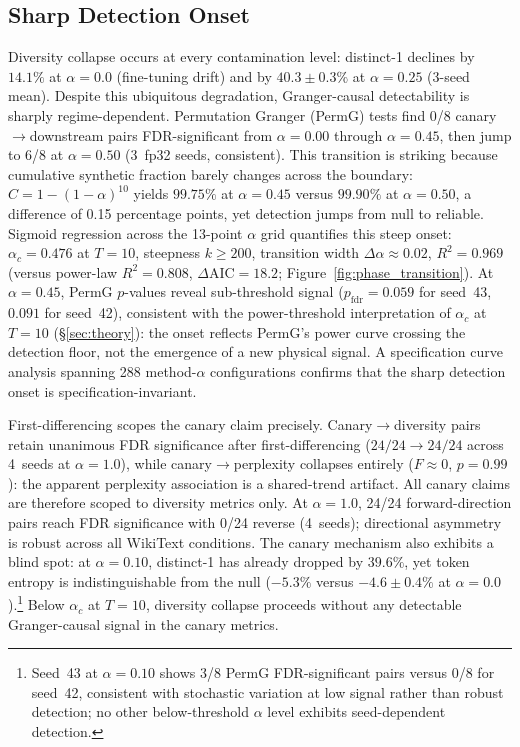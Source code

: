 \subsection{Sharp Detection Onset}
\label{sec:regime}

Diversity collapse occurs at every contamination level: distinct-1 declines by $14.1\%$ at $\alpha{=}0.0$ (fine-tuning drift) and by $40.3{\pm}0.3\%$ at $\alpha{=}0.25$ (3-seed mean).
Despite this ubiquitous degradation, Granger-causal detectability is sharply regime-dependent.
Permutation Granger (PermG) tests find 0/8 canary$\to$downstream pairs FDR-significant from $\alpha{=}0.00$ through $\alpha{=}0.45$, then jump to 6/8 at $\alpha{=}0.50$ (3~fp32 seeds, consistent).
This transition is striking because cumulative synthetic fraction barely changes across the boundary: $C = 1{-}(1{-}\alpha)^{10}$ yields $99.75\%$ at $\alpha{=}0.45$ versus $99.90\%$ at $\alpha{=}0.50$, a difference of 0.15 percentage points, yet detection jumps from null to reliable.
Sigmoid regression across the 13-point $\alpha$ grid quantifies this steep onset: $\alpha_c = 0.476$ at $T{=}10$, steepness $k \geq 200$, transition width $\Delta\alpha \approx 0.02$, $R^2 = 0.969$ (versus power-law $R^2 = 0.808$, $\Delta\mathrm{AIC} = 18.2$; Figure~\ref{fig:phase_transition}).
At $\alpha{=}0.45$, PermG $p$-values reveal sub-threshold signal ($p_{\mathrm{fdr}} = 0.059$ for seed~43, $0.091$ for seed~42), consistent with the power-threshold interpretation of $\alpha_c$ at $T{=}10$ (\S\ref{sec:theory}): the onset reflects PermG's power curve crossing the detection floor, not the emergence of a new physical signal.
A specification curve analysis spanning 288 method-$\alpha$ configurations confirms that the sharp detection onset is specification-invariant.

First-differencing scopes the canary claim precisely.
Canary$\to$diversity pairs retain unanimous FDR significance after first-differencing ($24/24 \to 24/24$ across 4~seeds at $\alpha{=}1.0$), while canary$\to$perplexity collapses entirely ($F \approx 0$, $p = 0.99$): the apparent perplexity association is a shared-trend artifact.
All canary claims are therefore scoped to diversity metrics only.
At $\alpha{=}1.0$, 24/24 forward-direction pairs reach FDR significance with 0/24 reverse (4~seeds); directional asymmetry is robust across all WikiText conditions.
The canary mechanism also exhibits a blind spot: at $\alpha{=}0.10$, distinct-1 has already dropped by $39.6\%$, yet token entropy is indistinguishable from the null ($-5.3\%$ versus $-4.6{\pm}0.4\%$ at $\alpha{=}0.0$).\footnote{Seed~43 at $\alpha{=}0.10$ shows 3/8 PermG FDR-significant pairs versus 0/8 for seed~42, consistent with stochastic variation at low signal rather than robust detection; no other below-threshold $\alpha$ level exhibits seed-dependent detection.}
Below $\alpha_c$ at $T{=}10$, diversity collapse proceeds without any detectable Granger-causal signal in the canary metrics.

